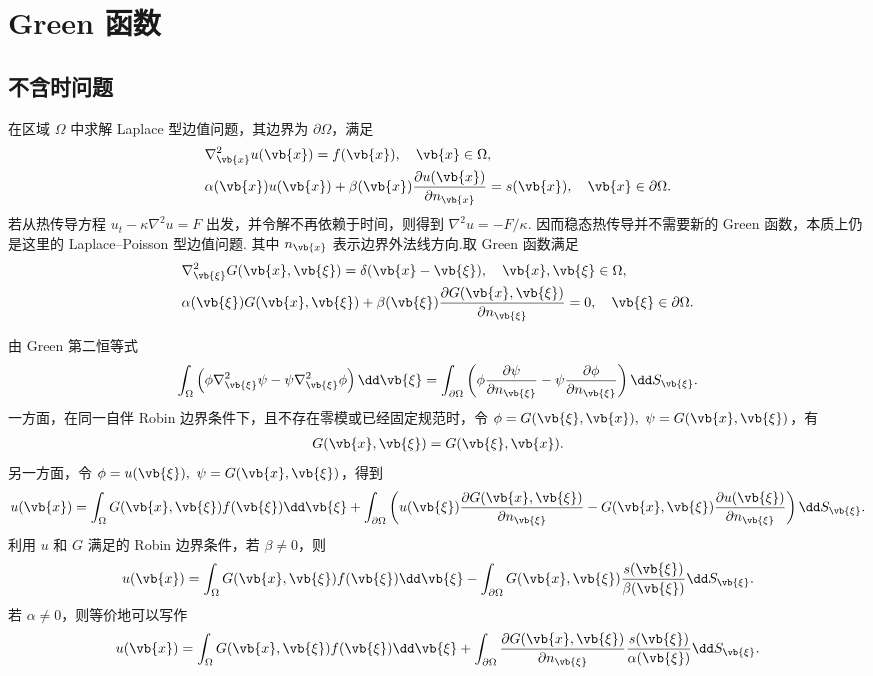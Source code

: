 \chapter{Green 函数}
\section{不含时问题}

在区域 \(\Omega\) 中求解 Laplace 型边值问题，其边界为 \(\partial\Omega\)，满足
\begin{align*}
	&\nabla_{\vb{x}}^2u(\vb{x}) = f(\vb{x}),\quad \vb{x}\in\Omega,\\
	&\alpha(\vb{x})u(\vb{x})+\beta(\vb{x})\frac{\partial u(\vb{x})}{\partial n_{\vb{x}}}=s(\vb{x}),\quad \vb{x}\in\partial\Omega.
\end{align*}
若从热传导方程 \(u_t-\kappa\nabla^2u=F\) 出发，并令解不再依赖于时间，则得到 \(\nabla^2u=-F/\kappa\). 因而稳态热传导并不需要新的 Green 函数，本质上仍是这里的 Laplace--Poisson 型边值问题.
其中 \(n_{\vb{x}}\) 表示边界外法线方向.取 Green 函数满足
\begin{align*}
	&\nabla_{\vb{\xi}}^2G(\vb{x},\vb{\xi})=\delta(\vb{x}-\vb{\xi}),\quad \vb{x},\vb{\xi}\in\Omega,\\
	&\alpha(\vb{\xi})G(\vb{x},\vb{\xi})+\beta(\vb{\xi})\frac{\partial G(\vb{x},\vb{\xi})}{\partial n_{\vb{\xi}}}=0,
	\quad \vb{\xi}\in\partial\Omega.
\end{align*}

由 Green 第二恒等式
\begin{align*}
	\int_\Omega\left(\phi\nabla_{\vb{\xi}}^2\psi-\psi\nabla_{\vb{\xi}}^2\phi\right)\dd\vb{\xi}
	=\int_{\partial\Omega}\left(\phi\frac{\partial\psi}{\partial n_{\vb{\xi}}}-\psi\frac{\partial\phi}{\partial n_{\vb{\xi}}}\right)\dd S_{\vb{\xi}}.
\end{align*}
一方面，在同一自伴 Robin 边界条件下，且不存在零模或已经固定规范时，令 \(\phi=G(\vb{\xi},\vb{x}),\ \psi=G(\vb{x},\vb{\xi})\)，有
\begin{align*}
	G(\vb{x},\vb{\xi})=G(\vb{\xi},\vb{x}).
\end{align*}
另一方面，令 \(\phi=u(\vb{\xi}),\ \psi=G(\vb{x},\vb{\xi})\)，得到
\begin{align*}
	u(\vb{x})
	=\int_\Omega G(\vb{x},\vb{\xi})f(\vb{\xi})\dd\vb{\xi}
	+\int_{\partial\Omega}\left(u(\vb{\xi})\frac{\partial G(\vb{x},\vb{\xi})}{\partial n_{\vb{\xi}}}-G(\vb{x},\vb{\xi})\frac{\partial u(\vb{\xi})}{\partial n_{\vb{\xi}}}\right)\dd S_{\vb{\xi}}.
\end{align*}
利用 \(u\) 和 \(G\) 满足的 Robin 边界条件，若 \(\beta\neq0\)，则
\begin{align*}
	u(\vb{x})
	=\int_\Omega G(\vb{x},\vb{\xi})f(\vb{\xi})\dd\vb{\xi}
	-\int_{\partial\Omega}G(\vb{x},\vb{\xi})\frac{s(\vb{\xi})}{\beta(\vb{\xi})}\dd S_{\vb{\xi}}.
\end{align*}
若 \(\alpha\neq0\)，则等价地可以写作
\begin{align*}
	u(\vb{x})
	=\int_\Omega G(\vb{x},\vb{\xi})f(\vb{\xi})\dd\vb{\xi}
	+\int_{\partial\Omega}\frac{\partial G(\vb{x},\vb{\xi})}{\partial n_{\vb{\xi}}}\frac{s(\vb{\xi})}{\alpha(\vb{\xi})}\dd S_{\vb{\xi}}.
\end{align*}

